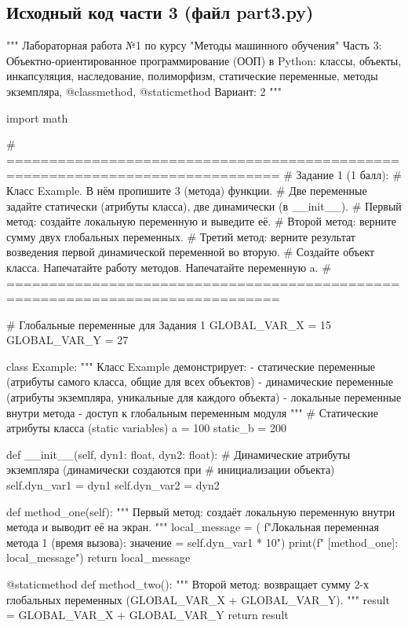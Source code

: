 \documentclass[14pt,a4paper]{extarticle}
\begin{document}
\subsection{Исходный код части 3 (файл part3.py)}
\begin{CodeListing}
"""
Лабораторная работа №1 по курсу "Методы машинного обучения"
Часть 3: Объектно-ориентированное программирование (ООП) в Python:
         классы, объекты, инкапсуляция, наследование, полиморфизм,
         статические переменные, методы экземпляра, @classmethod, @staticmethod
Вариант: 2
"""

import math


# ==============================================================================
# Задание 1 (1 балл):
# Класс Example. В нём пропишите 3 (метода) функции.
# Две переменные задайте статически (атрибуты класса), две динамически (в __init__).
# Первый метод: создайте локальную переменную и выведите её.
# Второй метод: верните сумму двух глобальных переменных.
# Третий метод: верните результат возведения первой динамической переменной во вторую.
# Создайте объект класса. Напечатайте работу методов. Напечатайте переменную a.
# ==============================================================================

# Глобальные переменные для Задания 1
GLOBAL_VAR_X = 15
GLOBAL_VAR_Y = 27


class Example:
    """
    Класс Example демонстрирует:
    - статические переменные (атрибуты самого класса, общие для всех объектов)
    - динамические переменные (атрибуты экземпляра, уникальные для каждого объекта)
    - локальные переменные внутри метода
    - доступ к глобальным переменным модуля
    """
    # Статические атрибуты класса (static variables)
    a = 100
    static_b = 200

    def __init__(self, dyn1: float, dyn2: float):
        # Динамические атрибуты экземпляра (динамически создаются при
        # инициализации объекта)
        self.dyn_var1 = dyn1
        self.dyn_var2 = dyn2

    def method_one(self):
        """
        Первый метод: создаёт локальную переменную внутри метода и выводит её на экран.
        """
        local_message = (
            f"Локальная переменная метода 1 (время вызова): значение = {
                self.dyn_var1 * 10}")
        print(f"  [method_one]: {local_message}")
        return local_message

    @staticmethod
    def method_two():
        """
        Второй метод: возвращает сумму 2-х глобальных переменных (GLOBAL_VAR_X + GLOBAL_VAR_Y).
        """
        result = GLOBAL_VAR_X + GLOBAL_VAR_Y
        return result


\end{CodeListing}
\end{document}
